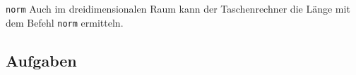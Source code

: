 \begin{bemerkung}{\texttt{norm}}{}
Auch im dreidimensionalen Raum kann der Taschenrechner die Länge mit
dem Befehl \texttt{norm} ermitteln.
\end{bemerkung}

\subsection*{Aufgaben}

